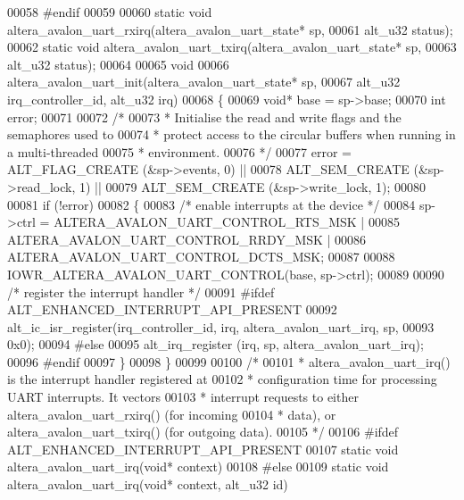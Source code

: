 \begin{DoxyCode}
00058 \textcolor{preprocessor}{#endif }
00059 
00060 \textcolor{keyword}{static} \textcolor{keywordtype}{void} altera_avalon_uart_rxirq(altera_avalon_uart_state* sp,
00061   alt_u32 status);
00062 \textcolor{keyword}{static} \textcolor{keywordtype}{void} altera_avalon_uart_txirq(altera_avalon_uart_state* sp,
00063   alt_u32 status);
00064 
00065 \textcolor{keywordtype}{void} 
00066 altera_avalon_uart_init(altera_avalon_uart_state* sp, 
00067   alt_u32 irq\_controller\_id,  alt_u32 irq)
00068 \{
00069   \textcolor{keywordtype}{void}* base = sp->base;
00070   \textcolor{keywordtype}{int} error;
00071 
00072   \textcolor{comment}{/* }
00073 \textcolor{comment}{   * Initialise the read and write flags and the semaphores used to }
00074 \textcolor{comment}{   * protect access to the circular buffers when running in a multi-threaded}
00075 \textcolor{comment}{   * environment.}
00076 \textcolor{comment}{   */}
00077   error = ALT_FLAG_CREATE (&sp->events, 0)    || 
00078           ALT_SEM_CREATE (&sp->read\_lock, 1)  ||
00079           ALT_SEM_CREATE (&sp->write\_lock, 1);
00080 
00081   \textcolor{keywordflow}{if} (!error)
00082   \{
00083     \textcolor{comment}{/* enable interrupts at the device */}
00084     sp->ctrl = ALTERA_AVALON_UART_CONTROL_RTS_MSK  |
00085                 ALTERA_AVALON_UART_CONTROL_RRDY_MSK |
00086                 ALTERA_AVALON_UART_CONTROL_DCTS_MSK;
00087 
00088     IOWR_ALTERA_AVALON_UART_CONTROL(base, sp->ctrl); 
00089   
00090     \textcolor{comment}{/* register the interrupt handler */}
00091 \textcolor{preprocessor}{#ifdef ALT\_ENHANCED\_INTERRUPT\_API\_PRESENT}
00092     alt\_ic\_isr\_register(irq\_controller\_id, irq, altera_avalon_uart_irq, sp, 
00093       0x0);
00094 \textcolor{preprocessor}{#else}
00095     alt_irq_register (irq, sp, altera_avalon_uart_irq);
00096 \textcolor{preprocessor}{#endif  }
00097   \}
00098 \}
00099 
00100 \textcolor{comment}{/*}
00101 \textcolor{comment}{ * altera\_avalon\_uart\_irq() is the interrupt handler registered at }
00102 \textcolor{comment}{ * configuration time for processing UART interrupts. It vectors }
00103 \textcolor{comment}{ * interrupt requests to either altera\_avalon\_uart\_rxirq() (for incoming }
00104 \textcolor{comment}{ * data), or altera\_avalon\_uart\_txirq() (for outgoing data).}
00105 \textcolor{comment}{ */}
00106 \textcolor{preprocessor}{#ifdef ALT\_ENHANCED\_INTERRUPT\_API\_PRESENT}
00107 \textcolor{keyword}{static} \textcolor{keywordtype}{void} altera_avalon_uart_irq(\textcolor{keywordtype}{void}* context)
00108 \textcolor{preprocessor}{#else}
00109 \textcolor{keyword}{static} \textcolor{keywordtype}{void} altera_avalon_uart_irq(\textcolor{keywordtype}{void}* context, alt_u32 \textcolor{keywordtype}{id})

\end{DoxyCode}
